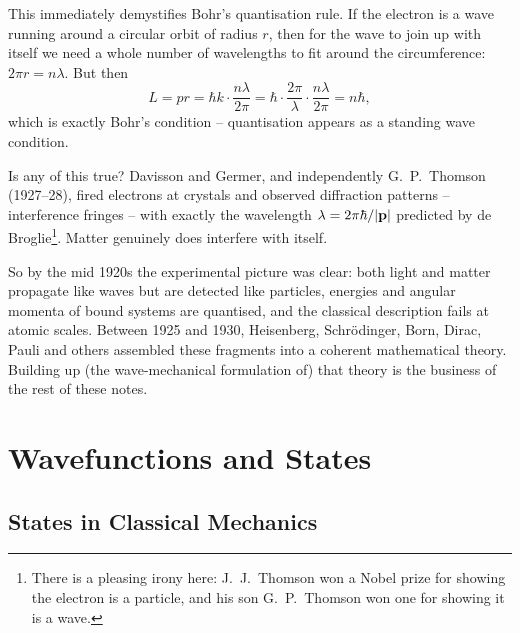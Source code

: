 \documentclass[a4paper]{scrartcl}
\begin{document}
This immediately demystifies Bohr's quantisation rule. If the electron is a wave running around a circular orbit of radius $r$, then for the wave to join up with itself we need a whole number of wavelengths to fit around the circumference: $2 \pi r = n \lambda$. But then
$$
L = p r = \hbar k \cdot \frac{n \lambda}{2 \pi} = \hbar \cdot \frac{2 \pi}{\lambda} \cdot \frac{n \lambda}{2 \pi} = n \hbar,
$$
which is exactly Bohr's condition -- quantisation appears as a standing wave condition.

\begin{center}
\end{center}

Is any of this true? Davisson and Germer, and independently G.\ P.\ Thomson (1927--28), fired electrons at crystals and observed diffraction patterns -- interference fringes -- with exactly the wavelength $\lambda = 2 \pi \hbar / |\mathbf{p}|$ predicted by de Broglie\footnote{There is a pleasing irony here: J.\ J.\ Thomson won a Nobel prize for showing the electron is a particle, and his son G.\ P.\ Thomson won one for showing it is a wave.}. Matter genuinely does interfere with itself.

So by the mid 1920s the experimental picture was clear: both light and matter propagate like waves but are detected like particles, energies and angular momenta of bound systems are quantised, and the classical description fails at atomic scales. Between 1925 and 1930, Heisenberg, Schr\"odinger, Born, Dirac, Pauli and others assembled these fragments into a coherent mathematical theory. Building up (the wave-mechanical formulation of) that theory is the business of the rest of these notes.

\section{Wavefunctions and States}

\subsection{States in Classical Mechanics}
\end{document}
